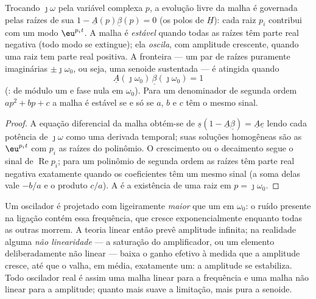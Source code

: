 \begin{theorem}\label{thm:b2:feedback-oscillators:stability}
Trocando $\jmath\omega$ pela variável complexa $p$, a evolução livre da
malha é governada pelas raízes de sua \emph{}
$1 - \underline A(p)\underline\beta(p) = 0$ (os polos de $\underline H$): cada raiz
$p_i$ contribui com um modo $\eu^{p_it}$. A malha é \emph{estável} quando todas as
raízes têm parte real negativa (todo modo se extingue); ela
\emph{oscila}, com amplitude crescente, quando uma raiz tem parte real
positiva. A fronteira --- um par de raízes puramente imaginárias $\pm\jmath
\omega_0$, ou seja, uma senoide sustentada --- é atingida quando
\[
\underline A(\jmath\omega_0)\,\underline\beta(\jmath\omega_0) = 1
\]
(\emph{}:  de módulo um e fase
nula em $\omega_0$). Para um denominador de segunda ordem $ap^2 + bp + c$ a
malha é estável se e só se $a$, $b$ e $c$ têm o mesmo sinal.
\end{theorem}

\begin{proof}
A equação diferencial da malha obtém-se de $\underline s(1 -
\underline A\underline\beta) = \underline A\underline e$ lendo cada potência de $\jmath\omega$
como uma derivada temporal; suas soluções homogêneas são as $\eu^{p_it}$
com $p_i$ as raízes do polinômio. O crescimento ou o decaimento segue o
sinal de $\operatorname{Re}p_i$; para um polinômio de segunda ordem as raízes
têm parte real negativa exatamente quando os coeficientes têm um mesmo sinal
(a soma delas vale $-b/a$ e o produto $c/a$). A 
é a existência de uma raiz em $p = \jmath\omega_0$.
\end{proof}

\begin{remark}\label{rem:b2:feedback-oscillators:start}
Um oscilador é projetado com  ligeiramente \emph{maior} que
um em $\omega_0$: o ruído presente na ligação contém essa frequência,
que cresce exponencialmente enquanto todas as outras morrem. A teoria linear então
prevê amplitude infinita; na realidade alguma \emph{não linearidade} ---
a saturação do amplificador, ou um elemento deliberadamente não
linear --- baixa o ganho efetivo à medida que a amplitude cresce, até que o
 valha, em média, exatamente um: a amplitude se estabiliza. Todo oscilador
real é assim uma malha linear para a frequência e uma malha não linear
para a amplitude; quanto mais suave a limitação, mais pura a
senoide.
\end{remark}

